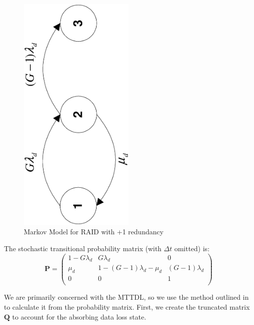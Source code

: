 \documentclass[11pt]{article}
\numberwithin{equation}{section}
\begin{document}
\begin{figure}[h]
\begin{center}
\includegraphics[angle=270,width=0.5\textwidth]{DriveMarkov}
\end{center}
\caption{Markov Model for RAID with +1 redundancy}
\label{fig-markov-raid}
\end{figure}

The stochastic transitional probability matrix (with $\Delta t$ omitted) is:
\begin{displaymath}
\mathbf{P} =
\left( \begin{array}{ccc}
1 - G \lambda_{d} &  G \lambda_{d} &  0  \\
\mu_{d}           & 1 -  (G - 1)\lambda_{d} - \mu_{d}  & (G - 1)\lambda_{d} \\
0                 &  0  & 1              \\
\end{array} \right)
\end{displaymath}

We are primarily concerned with the MTTDL, so we use the method outlined in
\cite{eval} to calculate it from the probability matrix.  First, we create the
truncated matrix $\mathbf{Q}$ to account for the absorbing data loss state.
\end{document}
